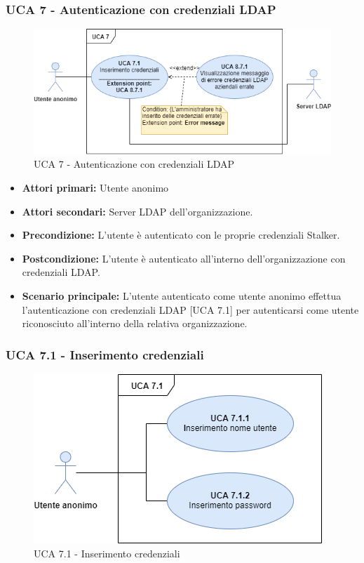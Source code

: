 


\subsubsection{UCA 7 - Autenticazione con credenziali LDAP}%

\begin{figure}[h]
	\centering
	\includegraphics[scale=0.4, center]{Sezioni/UseCase/Immagini/UCA7.png}
	\caption{UCA 7 - Autenticazione con credenziali LDAP}
\end{figure}

\begin{itemize}
	\item \textbf{Attori primari:} Utente anonimo 
	\item \textbf{Attori secondari:} Server LDAP dell'organizzazione.
	\item \textbf{Precondizione:} L'utente è autenticato con le proprie credenziali Stalker.
	\item \textbf{Postcondizione:} L'utente è autenticato all'interno dell'organizzazione con credenziali LDAP.
	\item \textbf{Scenario principale:} L'utente autenticato come utente anonimo effettua l'autenticazione con credenziali LDAP [UCA 7.1] per autenticarsi come utente riconosciuto all'interno della relativa organizzazione.
\end{itemize}

\subsubsection{UCA 7.1 - Inserimento credenziali}
\begin{figure}[h]
	\centering
	\includegraphics[scale=0.5, center]{Sezioni/UseCase/Immagini/UCA7.1.png}
	\caption{UCA 7.1 - Inserimento credenziali}
\end{figure}

